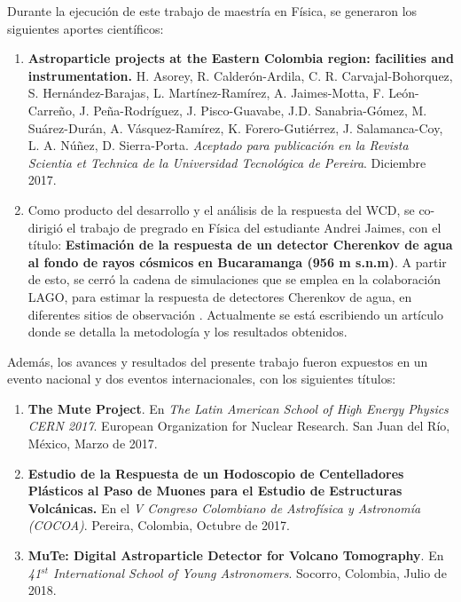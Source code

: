 \documentclass[12pt,oneside,openany,letter]{book}
\begin{document}
Durante la ejecuci\'on de este trabajo de maestr\'ia en F\'isica, se generaron los siguientes aportes cient\'ificos:
\begin{enumerate}
\item \textbf{Astroparticle projects at the Eastern Colombia region: facilities and instrumentation.} H. Asorey, R. Calderón-Ardila, C. R. Carvajal-Bohorquez, S. Hernández-Barajas, L. Martínez-Ramírez, A. Jaimes-Motta, F. León-
Carreño, J. Peña-Rodríguez, J. Pisco-Guavabe, J.D. Sanabria-Gómez, M. Suárez-Durán, A. Vásquez-Ramírez, K. Forero-Gutiérrez, J. Salamanca-Coy, L. A. Núñez, D. Sierra-Porta.\textit{ Aceptado para publicaci\'on en la Revista Scientia et Technica de la Universidad Tecnol\'ogica de Pereira}. Diciembre 2017.

\item Como producto del desarrollo y el an\'alisis de la respuesta del WCD, se co-dirigi\'o el trabajo de pregrado en F\'isica del estudiante Andrei Jaimes, con el t\'itulo: \textbf{Estimaci\'on de la respuesta de un detector Cherenkov de agua al fondo de rayos c\'osmicos en Bucaramanga (956 m s.n.m)}. A partir de esto, se cerr\'o la cadena de simulaciones que se emplea en la colaboraci\'on LAGO, para estimar la respuesta de detectores Cherenkov de agua, en diferentes sitios de observaci\'on \cite{JaimesMotta2018}. Actualmente se est\'a escribiendo un art\'iculo donde se detalla la metodolog\'ia y los resultados obtenidos. 
\end{enumerate}
Adem\'as, los avances y resultados del presente trabajo fueron expuestos en un evento nacional y dos eventos internacionales, con los siguientes t\'itulos:
\begin{enumerate}
\item \textbf{The Mute Project}. En \textit{The Latin American School of High Energy Physics CERN 2017}. European Organization for Nuclear Research. San Juan del Río, México, Marzo de 2017. 

\item \textbf{Estudio de la Respuesta de un Hodoscopio de Centelladores Plásticos al Paso de Muones para el Estudio de Estructuras Volcánicas.} En el \textit{V Congreso Colombiano de Astrofísica y Astronomía (COCOA)}. Pereira, Colombia, Octubre de 2017. 

\item \textbf{MuTe: Digital Astroparticle Detector for Volcano Tomography}. En \textit{41$^{st}$ International School of Young Astronomers}. Socorro, Colombia, Julio de 2018.
\end{enumerate}
\appendix
\end{document}
